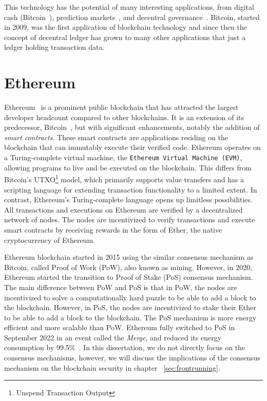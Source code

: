 This technology has the potential of many interesting applications, from digital cash (\eg Bitcoin~\cite{nakamoto2008bitcoin}), prediction markets~\cite{clark2014decentralizing}, and decentral governance~\cite{aragonwebsite}. Bitcoin, started in 2009, was the first application of blockchain technology and since then the concept of decentral ledger has grown to many other applications that just a ledger holding transaction data. 


\section{Ethereum}

Ethereum~\cite{wood2014ethereum} is a prominent public blockchain that has attracted the largest developer headcount compared to other blockchains. It is an extension of its predecessor, Bitcoin~\cite{nakamoto2008bitcoin}, but with significant enhancements, notably the addition of \textit{smart contracts}. These smart contracts are applications residing on the blockchain that can immutably execute their verified code. Ethereum operates on a Turing-complete virtual machine, the \texttt{Ethereum Virtual Machine (EVM)}, allowing programs to live and be executed on the blockchain. This differs from Bitcoin's UTXO\footnote{Unspend Transaction Output} model, which primarily supports value transfers and has a scripting language for extending transaction functionality to a limited extent. In contrast, Ethereum's Turing-complete language opens up limitless possibilities.  All transactions and executions on Ethereum are verified by a decentralized network of nodes. The nodes are incentivized to verify transactions and execute smart contracts by receiving rewards in the form of Ether, the native cryptocurrency of Ethereum. 

Ethereum blockchain started in 2015 using the similar consensus mechanism as Bitcoin, called Proof of Work (PoW), also known as mining. However, in 2020, Ethereum started the transition to Proof of Stake (PoS) consensus mechanism. The main difference between PoW and PoS is that in PoW, the nodes are incentivized to solve a computationally hard puzzle to be able to add a block to the blockchain. However, in PoS, the nodes are incentivized to stake their Ether to be able to add a block to the blockchain. The PoS mechanism is more energy efficient and more scalable than PoW. Ethereum fully switched to PoS in September 2022 in an event called the \textit{Merge}, and reduced its energy consumption by 99.5\%~\cite{themerge}. In this dissertation, we do not directly focus on the consensus mechanisms, however, we will discuss the implications of the consensus mechanism on the blockchain security in chapter ~\ref{sec:frontrunning}. 


